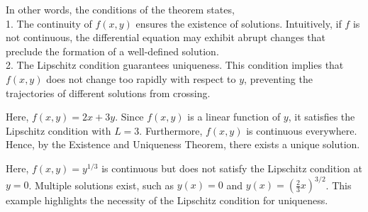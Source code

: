 \noindent In other words, the conditions of the theorem states, \\
1. The continuity of $f(x, y)$ ensures the existence of solutions. 
Intuitively, if $f$ is not continuous, the differential equation may exhibit abrupt changes that preclude the formation of a well-defined solution.\\
2. The Lipschitz condition guarantees uniqueness. 
This condition implies that $f(x, y)$ does not change too rapidly with respect to $y$, preventing the trajectories of different solutions from crossing.

\noindent Here, $f(x, y) = 2x + 3y$. 
Since $f(x, y)$ is a linear function of $y$, it satisfies the Lipschitz condition with $L = 3$. 
Furthermore, $f(x, y)$ is continuous everywhere. 
Hence, by the Existence and Uniqueness Theorem, there exists a unique solution.

\noindent Here, $f(x, y) = y^{1/3}$ is continuous but does not satisfy the Lipschitz condition at $y = 0$. 
Multiple solutions exist, such as $y(x) = 0$ and $y(x) = \left(\frac{2}{3}x\right)^{3/2}$. 
This example highlights the necessity of the Lipschitz condition for uniqueness.